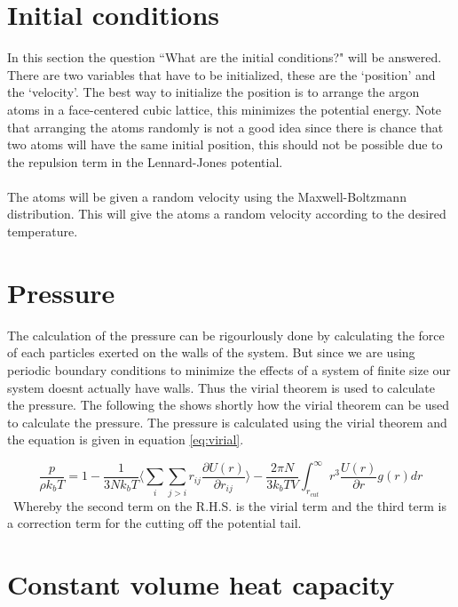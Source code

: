 \documentclass[12pt,a4paper]{report}
\begin{document}
\section{Initial conditions}
In this section the question ``What are the initial conditions?" will be answered.\\
There are two variables that have to be initialized, these are the `position' and the `velocity'. The best way to initialize the position is to arrange the argon atoms in a face-centered cubic lattice, this minimizes the potential energy. Note that arranging the atoms randomly is not a good idea since there is chance that two atoms will have the same initial position, this should not be possible due to the repulsion term in the Lennard-Jones potential.\\ \\ The atoms will be given a random velocity using the Maxwell-Boltzmann distribution. This will give the atoms a random velocity according to the desired temperature.

\section{Pressure}

The calculation of the pressure can be rigourlously done by calculating the force of each particles exerted on the walls of the system. But since we are using periodic boundary conditions to minimize the effects of a system of finite size our system doesnt actually have walls. Thus the virial theorem is used to calculate the pressure. The following the shows shortly how the virial theorem can be used to calculate the pressure. The pressure is calculated using the virial theorem and the equation is given in equation \ref{eq:virial}.

\begin{equation}\label{eq:virial}
\frac{p}{\rho k_bT}=1-\frac{1}{3Nk_bT}\Big \langle \sum_i \sum_{j>i}r_{ij}\frac{\partial U(r)}{\partial r_{ij}}\Big \rangle -\frac{2\pi N}{3k_b T V}\int_{r_{cut}}^\infty r^3 \frac{U(r)}{\partial r}g(r)dr
\end{equation}
\
Whereby the second term on the R.H.S. is the virial term and the third term is a correction term for the cutting off the potential tail.

\section{Constant volume heat capacity}
\end{document}
